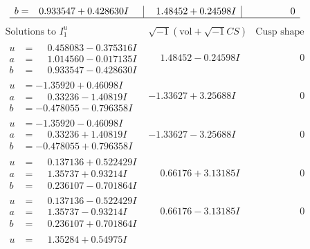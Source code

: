 \documentclass[1p]{elsarticle_modified}
\theoremstyle{definition}
\newcommand{\I}{\sqrt{-1}}
\begin{document}
$$\begin{array}{c|c|c}
\begin{aligned}
b &= \phantom{-}0.933547 + 0.428630 I\end{aligned}
 & \phantom{-}1.48452 + 0.24598 I & \phantom{-0.000000 } 0\\
 \hline 
 \end{array}$$\newpage$$\begin{array}{c|c|c}  
\text{Solutions to }I^u_{1}& \I (\text{vol} + \sqrt{-1}CS) & \text{Cusp shape}\\
 \hline 
\begin{aligned}
u &= \phantom{-}0.458083 - 0.375316 I \\
a &= \phantom{-}1.014560 - 0.017135 I \\
b &= \phantom{-}0.933547 - 0.428630 I\end{aligned}
 & \phantom{-}1.48452 - 0.24598 I & \phantom{-0.000000 } 0 \\ \hline\begin{aligned}
u &= -1.35920 + 0.46098 I \\
a &= \phantom{-}0.33236 - 1.40819 I \\
b &= -0.478055 - 0.796358 I\end{aligned}
 & -1.33627 + 3.25688 I & \phantom{-0.000000 } 0 \\ \hline\begin{aligned}
u &= -1.35920 - 0.46098 I \\
a &= \phantom{-}0.33236 + 1.40819 I \\
b &= -0.478055 + 0.796358 I\end{aligned}
 & -1.33627 - 3.25688 I & \phantom{-0.000000 } 0 \\ \hline\begin{aligned}
u &= \phantom{-}0.137136 + 0.522429 I \\
a &= \phantom{-}1.35737 + 0.93214 I \\
b &= \phantom{-}0.236107 - 0.701864 I\end{aligned}
 & \phantom{-}0.66176 + 3.13185 I & \phantom{-0.000000 } 0 \\ \hline\begin{aligned}
u &= \phantom{-}0.137136 - 0.522429 I \\
a &= \phantom{-}1.35737 - 0.93214 I \\
b &= \phantom{-}0.236107 + 0.701864 I\end{aligned}
 & \phantom{-}0.66176 - 3.13185 I & \phantom{-0.000000 } 0 \\ \hline\begin{aligned}
u &= \phantom{-}1.35284 + 0.54975 I \\

\end{aligned}
\end{array}$$
\end{document}
